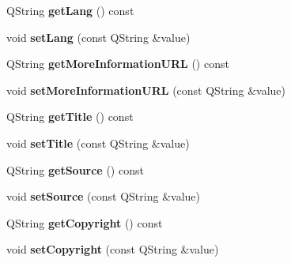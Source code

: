 \begin{DoxyCompactItemize}
\item 
\hypertarget{class_program_information_a7bd58817f43161397f476881961028fa}{Q\-String {\bfseries get\-Lang} () const }\label{class_program_information_a7bd58817f43161397f476881961028fa}

\item 
\hypertarget{class_program_information_aba59ff0f88687d670f252db33b53a649}{void {\bfseries set\-Lang} (const Q\-String \&value)}\label{class_program_information_aba59ff0f88687d670f252db33b53a649}

\item 
\hypertarget{class_program_information_ac54f5b650b5b206233b737b3c128fcc7}{Q\-String {\bfseries get\-More\-Information\-U\-R\-L} () const }\label{class_program_information_ac54f5b650b5b206233b737b3c128fcc7}

\item 
\hypertarget{class_program_information_a45ad7806b9d4aede5be915267694822d}{void {\bfseries set\-More\-Information\-U\-R\-L} (const Q\-String \&value)}\label{class_program_information_a45ad7806b9d4aede5be915267694822d}

\item 
\hypertarget{class_program_information_a3a9b7232d8ed4fdc683071772c775866}{Q\-String {\bfseries get\-Title} () const }\label{class_program_information_a3a9b7232d8ed4fdc683071772c775866}

\item 
\hypertarget{class_program_information_a7267b89c040b1a6e8cdb8666fbec9755}{void {\bfseries set\-Title} (const Q\-String \&value)}\label{class_program_information_a7267b89c040b1a6e8cdb8666fbec9755}

\item 
\hypertarget{class_program_information_ac520dd002aa17bfa0e0e14597edde494}{Q\-String {\bfseries get\-Source} () const }\label{class_program_information_ac520dd002aa17bfa0e0e14597edde494}

\item 
\hypertarget{class_program_information_a4fef4fa47d8039e52847af2fee8d933a}{void {\bfseries set\-Source} (const Q\-String \&value)}\label{class_program_information_a4fef4fa47d8039e52847af2fee8d933a}

\item 
\hypertarget{class_program_information_adcae064c0cfb0dea7a8e3c5bb27c832b}{Q\-String {\bfseries get\-Copyright} () const }\label{class_program_information_adcae064c0cfb0dea7a8e3c5bb27c832b}

\item 
\hypertarget{class_program_information_aa686cc12c2b0c7bc924eef529a088dfc}{void {\bfseries set\-Copyright} (const Q\-String \&value)}\label{class_program_information_aa686cc12c2b0c7bc924eef529a088dfc}

\end{DoxyCompactItemize}



